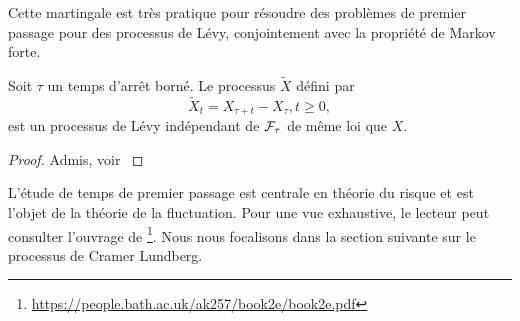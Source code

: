 Cette martingale est très pratique pour résoudre des problèmes de premier passage pour des processus de Lévy, conjointement avec la propriété de Markov forte.
\begin{theo}\label{theo:levy_strong_markov}
Soit $\tau$ un temps d'arrêt borné. Le processus $\tilde{X}$ défini par 
$$
\tilde{X}_t = X_{\tau + t}-X_{\tau},t\geq 0,
$$
est un processus de Lévy indépendant de $\mathcal{F}_\tau$ de même loi que $X$.
\end{theo}
\begin{proof}
Admis, voir \citet[Chapitre 3]{Kyprianou2014}
\end{proof}

L'étude de temps de premier passage est centrale en théorie du risque et est l'objet de la théorie de la fluctuation. Pour une vue exhaustive, le lecteur peut consulter l'ouvrage de \citet{Kyprianou2014}\footnote{\url{https://people.bath.ac.uk/ak257/book2e/book2e.pdf}}. Nous nous focalisons dans la section suivante sur le processus de Cramer Lundberg.
